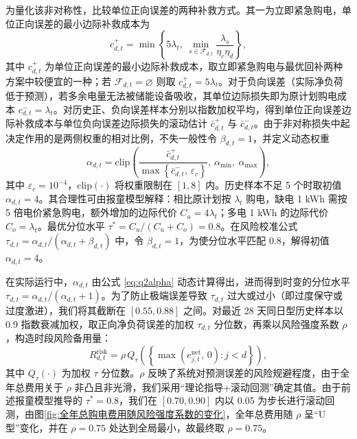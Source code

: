 \documentclass[withoutpreface,bwprint]{cumcmthesis}
\begin{document}
为量化该非对称性，比较单位正向误差的两种补救方式。其一为立即紧急购电，单位正向误差的最小边际补救成本为
\begin{equation}
	c^{+}_{d,t}=\min\left\{5\lambda_t,\ \min_{s\in\mathcal{F}_{d,t}}\frac{\lambda_s}{\eta_c\eta_d}\right\},
	\label{eq:q2cplus}
\end{equation}
\vspace*{-5pt}
其中 $c^{+}_{d,t}$ 为单位正向误差的最小边际补救成本，取立即紧急购电与最优回补两种方案中较便宜的一种；若 $\mathcal{F}_{d,t}=\varnothing$ 则取 $c^{+}_{d,t}=5\lambda_t$。对于负向误差（实际净负荷低于预测），若多余电量无法被储能设备吸收，其单位边际损失即为原计划购电成本 $c^{-}_{d,t}=\lambda_t$。对历史正、负向误差样本分别以指数加权平均，得到单位正向误差边际补救成本与单位负向误差边际损失的滚动估计 $\bar c^{+}_{d,t}$ 与 $\bar c^{-}_{d,t}$。由于非对称损失中起决定作用的是两侧权重的相对比例，不失一般性令 $\beta_{d,t}=1$，并定义动态权重
\vspace*{-5pt}
\begin{equation}
	\alpha_{d,t}=\mathrm{clip}\!\left(\frac{\bar c^{+}_{d,t}}{\max\left\{\bar c^{-}_{d,t},\,\varepsilon_c\right\}},\ \alpha_{\min},\ \alpha_{\max}\right),
	\label{eq:q2alpha}
\end{equation}
其中 $\varepsilon_c=10^{-4}$，$\mathrm{clip}(\cdot)$ 将权重限制在 $[1,8]$ 内。历史样本不足 5 个时取初值 $\alpha_{d,t}=4$。其合理性可由报童模型解释：相比原计划按 $\lambda_t$ 购电，缺电 1 kWh 需按 5 倍电价紧急购电，额外增加的边际代价 $C_u = 4\lambda_t$；多电 1 kWh 的边际代价 $C_o = \lambda_t$。最优分位水平 $\tau^* = C_u / (C_u + C_o) = 0.8$。在风险校准公式 $\tau_{d,t} = \alpha_{d,t} / (\alpha_{d,t} + \beta_{d,t})$ 中，令 $\beta_{d,t}=1$，为使分位水平匹配 0.8，解得初值 $\alpha_{d,t}=4$。

在实际运行中，$\alpha_{d,t}$ 由公式 \eqref{eq:q2alpha} 动态计算得出，进而得到时变的分位水平 $\tau_{d,t} = \alpha_{d,t} / (\alpha_{d,t} + 1)$。为了防止极端误差导致 $\tau_{d,t}$ 过大或过小（即过度保守或过度激进），我们将其截断在 $[0.55, 0.88]$ 之间。对最近 28 天同日型历史样本以 0.9 指数衰减加权，取正向净负荷误差的加权 $\tau_{d,t}$ 分位数，再乘以风险强度系数 $\rho$，构造时段风险备用量：
\begin{equation}
	R^{\mathrm{risk}}_{d,t}=\rho\, Q_{\tau}\!\left(\left\{\max\left(e^{\mathrm{net}}_{j,t},\,0\right): j<d\right\}\right),
	\label{eq:q2risk}
\end{equation}
其中 $Q_\tau(\cdot)$ 为加权 $\tau$ 分位数。$\rho$ 反映了系统对预测误差的风险规避程度，由于全年总费用关于 $\rho$ 非凸且非光滑，我们采用“理论指导+滚动回测”确定其值。由于前述报童模型推导的 $\tau^*=0.8$，我们在 $[0.70, 0.90]$ 内以 0.05 为步长进行滚动回测，由图\ref{fig:全年总购电费用随风险强度系数的变化}，全年总费用随 $\rho$ 呈“U 型”变化，并在 $\rho=0.75$ 处达到全局最小，故最终取 $\rho=0.75$。
\end{document}
